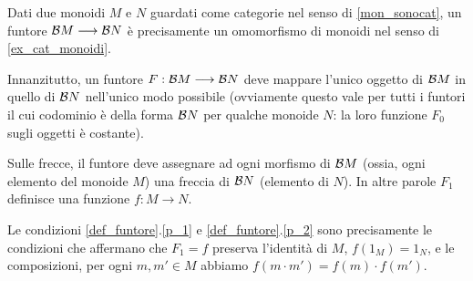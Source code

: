 \begin{example}\label{exa_funtori_da_gruppi}
	Dati due monoidi \(M\) e \(N\) guardati come categorie nel senso di \ref{mon_sonocat}, un funtore \(\mathcal{B} M\longrightarrow \mathcal{B} N\) è precisamente un omomorfismo di monoidi nel senso di \ref{ex_cat_monoidi}.

	Innanzitutto, un funtore \(F : \mathcal{B} M\longrightarrow \mathcal{B} N\) deve mappare l'unico oggetto di \(\mathcal{B} M\) in quello di \(\mathcal{B} N\) nell'unico modo possibile (ovviamente questo vale per tutti i funtori il cui codominio è della forma \(\mathcal{B} N\) per qualche monoide \(N\): la loro funzione \(F_0\) sugli oggetti è costante).

	Sulle frecce, il funtore deve assegnare ad ogni morfismo di \(\mathcal{B} M\) (ossia, ogni elemento del monoide \(M\)) una freccia di \(\mathcal{B} N\) (elemento di \(N\)). In altre parole \(F_1\) definisce una funzione \(f:M\to N\).

	Le condizioni \ref{def_funtore}.\ref{p_1} e \ref{def_funtore}.\ref{p_2} sono precisamente le condizioni che affermano che \(F_1=f\) preserva l'identità di \(M\), \(f(1_M)=1_N\), e le composizioni, per ogni \(m,m'\in M\) abbiamo \(f(m\cdot m')=f(m)\cdot f(m')\).
\end{example}
